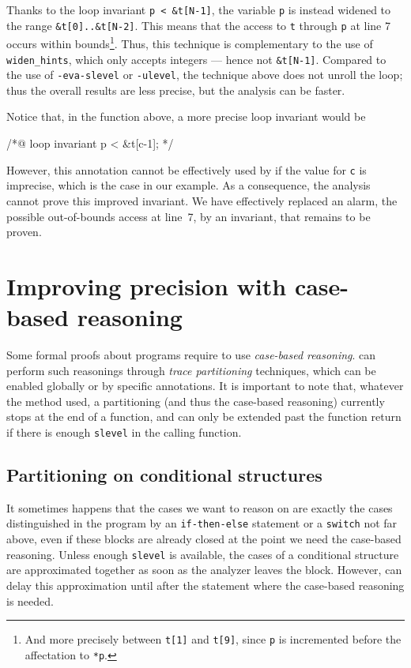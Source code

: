 \documentclass{frama-c-book}
\begin{document}
Thanks to the loop invariant \lstinline|p < &t[N-1]|, the variable
\lstinline+p+ is
instead widened to the range \lstinline+&t[0]..&t[N-2]+.
This means that the access to \lstinline+t+
through \lstinline+p+ at line 7 occurs
within bounds\footnote{And more precisely between \lstinline+t[1]+ and
\lstinline+t[9]+, since \lstinline+p+
is incremented before the affectation to \lstinline+*p+.}.
Thus, this technique is complementary to the use of
\lstinline+widen_hints+, which only accepts integers --- hence not
\lstinline+&t[N-1]+. Compared to the use
of \lstinline+-eva-slevel+ or \lstinline+-ulevel+,
the technique above does not unroll the loop; thus the overall results
are less precise, but the analysis can be faster.

Notice that, in the function above, a more precise loop invariant would be
\begin{listing-nonumber}
/*@ loop invariant p < &t[c-1]; */
\end{listing-nonumber}
However, this annotation cannot be effectively used by \Eva{}
if the value for \lstinline+c+ is imprecise, which is the case in our
example. As a consequence, the analysis cannot prove this improved invariant.
We have effectively replaced an alarm, the possible out-of-bounds access at
line~7, by an invariant, that remains to be proven.


\section{Improving precision with case-based reasoning}
\label{trace-partitioning}

Some formal proofs about programs require to use \emph{case-based reasoning}.
\Eva{} can perform such reasonings through \emph{trace partitioning}
\cite{trace-partitioning} techniques, which can be enabled globally or
by specific annotations. It is important to note that, whatever the method used,
a partitioning (and thus the case-based reasoning) currently stops at the end of
a function, and can only be extended past the function return if there is enough
\lstinline|slevel| in the calling function.


\subsection{Partitioning on conditional structures}
\label{partitioning-conditional-structures}

It sometimes happens that the cases we want to reason on are exactly the
cases distinguished in the program by an \lstinline|if-then-else| statement or a
\lstinline|switch| not far above, even if these blocks are already closed
at the point we need the case-based reasoning. Unless enough
\lstinline|slevel| is available, the cases of a conditional structure are
approximated together as soon as the analyzer leaves the block. However, \Eva{}
can delay this approximation until after the statement where the case-based
reasoning is needed.
\end{document}
